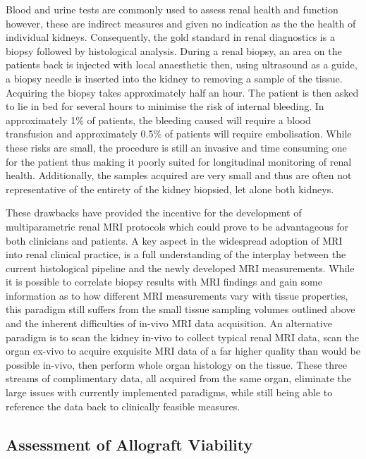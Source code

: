 Blood and urine tests are commonly used to assess renal health and function however, these are indirect measures and given no indication as the the health of individual kidneys. Consequently, the gold standard in renal diagnostics is a biopsy followed by histological analysis. During a renal biopsy, an area on the patients back is injected with local anaesthetic then, using ultrasound as a guide, a biopsy needle is inserted into the kidney to removing a sample of the tissue. Acquiring the biopsy takes approximately half an hour. The patient is then asked to lie in bed for several hours to minimise the risk of internal bleeding. In approximately 1\% of patients, the bleeding caused will require a blood transfusion and approximately 0.5\% of patients will require embolisation. While these risks are small, the procedure is still an invasive and time consuming one for the patient thus making it poorly suited for longitudinal monitoring of renal health. Additionally, the samples acquired are very small and thus are often not representative of the entirety of the kidney biopsied, let alone both kidneys.

These drawbacks have provided the incentive for the development of multiparametric renal \ac{MRI} protocols which could prove to be advantageous for both clinicians and patients. A key aspect in the widespread adoption of \ac{MRI} into renal clinical practice, is a full understanding of the interplay between the current histological pipeline and the newly developed \ac{MRI} measurements. While it is possible to correlate biopsy results with \ac{MRI} findings and gain some information as to how different \ac{MRI} measurements vary with tissue properties, this paradigm still suffers from the small tissue sampling volumes outlined above and the inherent difficulties of in-vivo \ac{MRI} data acquisition. An alternative paradigm is to scan the kidney in-vivo to collect typical renal \ac{MRI} data, scan the organ ex-vivo to acquire exquisite \ac{MRI} data of a far higher quality than would be possible in-vivo, then perform whole organ histology on the tissue. These three streams of complimentary data, all acquired from the same organ, eliminate the large issues with currently implemented paradigms, while still being able to reference the data back to clinically feasible measures.

\subsection{Assessment of Allograft Viability}

